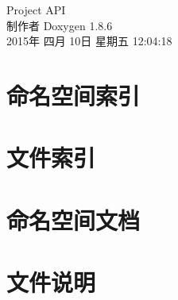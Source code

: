 \documentclass[twoside]{book}
\newcommand{\clearemptydoublepage}{%
  \newpage{\pagestyle{empty}\cleardoublepage}%
}
\begin{document}
\hypersetup{pageanchor=false}
\begin{titlepage}
\vspace*{7cm}
\begin{center}%
{\Large Project A\-P\-I }\\
\vspace*{1cm}
{\large 制作者 Doxygen 1.8.6}\\
\vspace*{0.5cm}
{\small 2015年 四月 10日 星期五 12:04:18}\\
\end{center}
\end{titlepage}
\clearemptydoublepage
\tableofcontents
\clearemptydoublepage
{}
\hypersetup{pageanchor=true}

\chapter{命名空间索引}

\chapter{文件索引}

\chapter{命名空间文档}




























\chapter{文件说明}





























\newpage
{}
{}
\printindex
\end{document}
